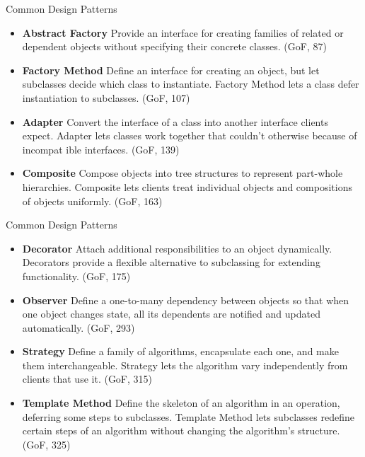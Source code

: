 \documentclass{beamer}
\begin{document}
\begin{frame}[fragile]{Common Design Patterns}

\begin{itemize}
\item {\bf Abstract Factory} Provide an interface for creating families of related or dependent objects without specifying their concrete classes. (GoF, 87)
\item {\bf Factory Method} Define an interface for creating an object, but let subclasses decide which class to instantiate. Factory Method lets a class defer instantiation to subclasses. (GoF, 107)
\item {\bf Adapter} Convert the interface of a class into another interface clients expect. Adapter lets classes work together that couldn't otherwise because of incompat ible interfaces. (GoF, 139)
\item {\bf Composite} Compose objects into tree structures to represent part-whole hierarchies. Composite lets clients treat individual objects and compositions of objects uniformly. (GoF, 163)
\end{itemize}


\end{frame}

\begin{frame}[fragile]{Common Design Patterns}

\begin{itemize}
\item {\bf Decorator} Attach additional responsibilities to an object dynamically. Decorators provide a flexible alternative to subclassing for extending functionality. (GoF, 175)
\item {\bf Observer} Define a one-to-many dependency between objects so that when one object changes state, all its dependents are notified and updated automatically. (GoF, 293)
\item {\bf Strategy} Define a family of algorithms, encapsulate each one, and make them interchangeable. Strategy lets the algorithm vary independently from clients that use it. (GoF, 315)
\item {\bf Template Method} Define the skeleton of an algorithm in an operation, deferring some steps to subclasses. Template Method lets subclasses redefine certain steps of an algorithm without changing the algorithm's structure. (GoF, 325)
\end{itemize}

\end{frame}









\end{document}
